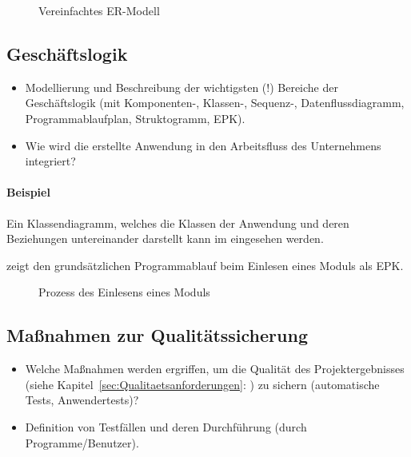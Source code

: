 \begin{figure}[htb]
\centering
{}
\caption{Vereinfachtes ER-Modell}
\label{fig:ER}
\end{figure} 


\subsection{Geschäftslogik}
\label{sec:Geschaeftslogik}

\begin{itemize}
	\item Modellierung und Beschreibung der wichtigsten (!) Bereiche der Geschäftslogik (\zB mit Kom\-po\-nen\-ten-, Klassen-, Sequenz-, Datenflussdiagramm, Programmablaufplan, Struktogramm, \ac{EPK}).
	\item Wie wird die erstellte Anwendung in den Arbeitsfluss des Unternehmens integriert?
\end{itemize}

\paragraph{Beispiel}
Ein Klassendiagramm, welches die Klassen der Anwendung und deren Beziehungen untereinander darstellt kann im  eingesehen werden.

 zeigt den grundsätzlichen Programmablauf beim Einlesen eines Moduls als \ac{EPK}.
\begin{figure}[htb]
\centering
{}
\caption{Prozess des Einlesens eines Moduls}
\label{fig:Modulimport}
\end{figure}


\subsection{Maßnahmen zur Qualitätssicherung}
\label{sec:Qualitaetssicherung}
\begin{itemize}
	\item Welche Maßnahmen werden ergriffen, um die Qualität des Projektergebnisses (siehe Kapitel~\ref{sec:Qualitaetsanforderungen}: ) zu sichern (\zB automatische Tests, Anwendertests)?
	\item \Ggfs Definition von Testfällen und deren Durchführung (durch Programme/Benutzer).
\end{itemize}


